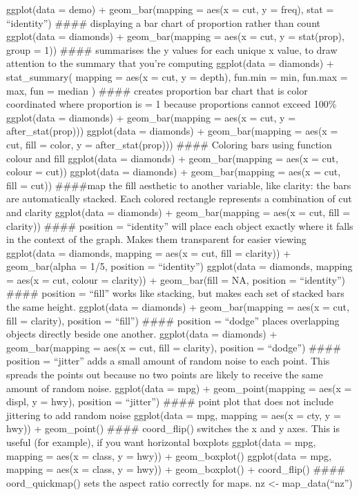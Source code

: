 \documentclass[
]{article}
\begin{document}
ggplot(data = demo) + geom\_bar(mapping = aes(x = cut, y = freq), stat =
``identity'') \#\#\#\# displaying a bar chart of proportion rather than
count ggplot(data = diamonds) + geom\_bar(mapping = aes(x = cut, y =
stat(prop), group = 1)) \#\#\#\# summarises the y values for each unique
x value, to draw attention to the summary that you're computing
ggplot(data = diamonds) + stat\_summary( mapping = aes(x = cut, y =
depth), fun.min = min, fun.max = max, fun = median ) \#\#\#\# creates
proportion bar chart that is color coordinated where proportion is = 1
because proportions cannot exceed 100\% ggplot(data = diamonds) +
geom\_bar(mapping = aes(x = cut, y = after\_stat(prop))) ggplot(data =
diamonds) + geom\_bar(mapping = aes(x = cut, fill = color, y =
after\_stat(prop))) \#\#\#\# Coloring bars using function colour and
fill ggplot(data = diamonds) + geom\_bar(mapping = aes(x = cut, colour =
cut)) ggplot(data = diamonds) + geom\_bar(mapping = aes(x = cut, fill =
cut)) \#\#\#\#map the fill aesthetic to another variable, like clarity:
the bars are automatically stacked. Each colored rectangle represents a
combination of cut and clarity ggplot(data = diamonds) +
geom\_bar(mapping = aes(x = cut, fill = clarity)) \#\#\#\# position =
``identity'' will place each object exactly where it falls in the
context of the graph. Makes them transparent for easier viewing
ggplot(data = diamonds, mapping = aes(x = cut, fill = clarity)) +
geom\_bar(alpha = 1/5, position = ``identity'') ggplot(data = diamonds,
mapping = aes(x = cut, colour = clarity)) + geom\_bar(fill = NA,
position = ``identity'') \#\#\#\# position = ``fill'' works like
stacking, but makes each set of stacked bars the same height.
ggplot(data = diamonds) + geom\_bar(mapping = aes(x = cut, fill =
clarity), position = ``fill'') \#\#\#\# position = ``dodge'' places
overlapping objects directly beside one another. ggplot(data = diamonds)
+ geom\_bar(mapping = aes(x = cut, fill = clarity), position =
``dodge'') \#\#\#\# position = ``jitter'' adds a small amount of random
noise to each point. This spreads the points out because no two points
are likely to receive the same amount of random noise. ggplot(data =
mpg) + geom\_point(mapping = aes(x = displ, y = hwy), position =
``jitter'') \#\#\#\# point plot that does not include jittering to add
random noise ggplot(data = mpg, mapping = aes(x = cty, y = hwy)) +
geom\_point() \#\#\#\# coord\_flip() switches the x and y axes. This is
useful (for example), if you want horizontal boxplots ggplot(data = mpg,
mapping = aes(x = class, y = hwy)) + geom\_boxplot() ggplot(data = mpg,
mapping = aes(x = class, y = hwy)) + geom\_boxplot() + coord\_flip()
\#\#\#\# oord\_quickmap() sets the aspect ratio correctly for maps. nz
\textless- map\_data(``nz'')
\end{document}
